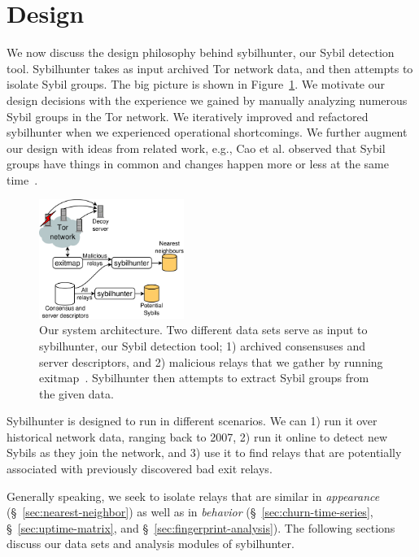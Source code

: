 \section{Design}
\label{sec:design}
We now discuss the design philosophy behind sybilhunter, our Sybil detection
tool.  Sybilhunter takes as input archived Tor network data, and then attempts
to isolate Sybil groups.  The big picture is shown in Figure~\ref{fig:system}.
We motivate our design decisions with the experience we gained by manually
analyzing numerous Sybil groups in the Tor network.  We iteratively improved
and refactored sybilhunter when we experienced operational shortcomings.  We
further augment our design with ideas from related work, e.g., Cao et al.
observed that Sybil groups have things in common and changes happen more or
less at the same time~\cite{Cao2014a}.

\begin{figure}[t]
	\centering
	\includegraphics[width=0.42\textwidth]{diagrams/system_architecture.pdf}
	\caption{Our system architecture.  Two different data sets serve as input
		to sybilhunter, our Sybil detection tool; 1) archived consensuses and
		server descriptors, and 2) malicious relays that we gather by running
		exitmap~\cite{Winter2014a}.  Sybilhunter then attempts to extract Sybil
		groups from the given data.}
	\label{fig:system}
\end{figure}

Sybilhunter is designed to run in different scenarios.  We can 1) run it over
historical network data, ranging back to 2007, 2) run it online to detect new
Sybils as they join the network, and 3) use it to find relays that are
potentially associated with previously discovered bad exit relays.

Generally speaking, we seek to isolate relays that are similar in
\emph{appearance} (\S~\ref{sec:nearest-neighbor}) as well as in \emph{behavior}
(\S~\ref{sec:churn-time-series}, \S~\ref{sec:uptime-matrix}, and
\S~\ref{sec:fingerprint-analysis}).  The following sections discuss our data sets
and analysis modules of sybilhunter.

